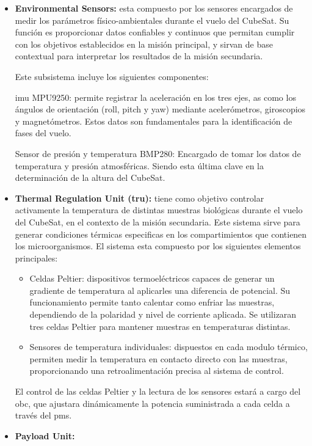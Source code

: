 \begin{itemize}
      \item \textbf{Environmental Sensors:} esta compuesto por los sensores encargados de medir los
        parámetros físico-ambientales durante el vuelo del CubeSat. Su función es proporcionar
        datos confiables y continuos que permitan cumplir con los objetivos establecidos en la
        misión principal, y sirvan de base contextual para interpretar los resultados de la misión
        secundaria.

        Este subsistema incluye los siguientes componentes:

        \acrfull{imu} MPU9250: permite registrar la aceleración en los
        tres ejes, as como los ángulos de orientación (roll, pitch y yaw) mediante acelerómetros,
        giroscopios y magnetómetros. Estos datos son fundamentales para la identificación de fases
        del vuelo.

        Sensor de presión y temperatura BMP280: Encargado de tomar los datos de temperatura y presión
        atmosféricas. Siendo esta última clave en la determinación de la altura del CubeSat.

      \item \textbf{Thermal Regulation Unit (\acrshort{tru}):} tiene como objetivo controlar activamente la
        temperatura de distintas muestras biológicas durante el vuelo del CubeSat, en el contexto de la
        misión secundaria. Este sistema sirve para generar condiciones térmicas
        especificas en los compartimientos que contienen los microorganismos.
        El sistema esta compuesto por los siguientes elementos principales:

      \begin{itemize}
        \item Celdas Peltier: dispositivos termoeléctricos capaces de generar un gradiente de
          temperatura al aplicarles una diferencia de potencial. Su funcionamiento permite
          tanto calentar como enfriar las muestras, dependiendo de la polaridad y nivel de
          corriente aplicada. Se utilizaran tres celdas Peltier para mantener muestras en
          temperaturas distintas.

        \item Sensores de temperatura individuales: dispuestos en cada modulo térmico, permiten medir la
          temperatura en contacto directo con las muestras, proporcionando
            una retroalimentación precisa al sistema de control.
      \end{itemize}

      El control de las celdas Peltier y la lectura de los sensores estará a cargo del \acrshort{obc}, que
      ajustara dinámicamente la potencia suministrada a cada celda a través del \acrshort{pms}.

      \item \textbf{Payload Unit:}

    \end{itemize}

